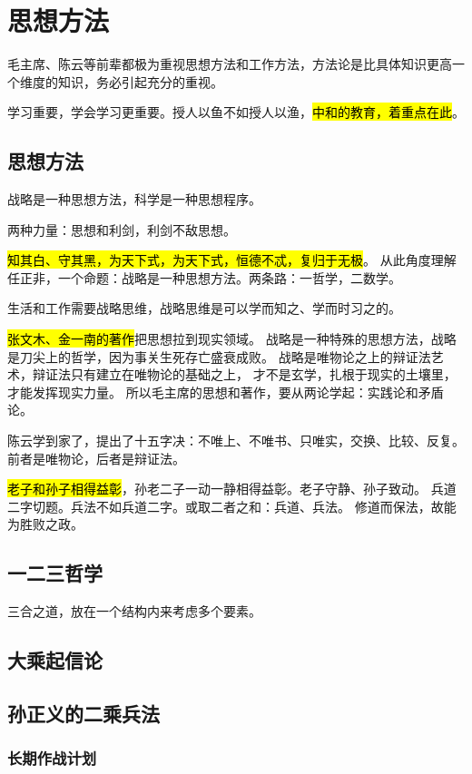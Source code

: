 \chapter{思想方法}

毛主席、陈云等前辈都极为重视思想方法和工作方法，方法论是比具体知识更高一个维度的知识，务必引起充分的重视。

学习重要，学会学习更重要。授人以鱼不如授人以渔，\hl{中和的教育，着重点在此}。

\section{思想方法}

战略是一种思想方法，科学是一种思想程序。

两种力量：思想和利剑，利剑不敌思想。

\hl{知其白、守其黑，为天下式，为天下式，恒德不忒，复归于无极}。
从此角度理解任正非，一个命题：战略是一种思想方法。两条路：一哲学，二数学。

生活和工作需要战略思维，战略思维是可以学而知之、学而时习之的。

\hl{张文木、金一南的著作}把思想拉到现实领域。
战略是一种特殊的思想方法，战略是刀尖上的哲学，因为事关生死存亡盛衰成败。
战略是唯物论之上的辩证法艺术，辩证法只有建立在唯物论的基础之上，
才不是玄学，扎根于现实的土壤里，才能发挥现实力量。
所以毛主席的思想和著作，要从两论学起：实践论和矛盾论。

陈云学到家了，提出了十五字决：不唯上、不唯书、只唯实，交换、比较、反复。
前者是唯物论，后者是辩证法。

\hl{老子和孙子相得益彰}，孙老二子一动一静相得益彰。老子守静、孙子致动。
兵道二字切题。兵法不如兵道二字。或取二者之和：兵道、兵法。
修道而保法，故能为胜败之政。

\section{一二三哲学}

三合之道，放在一个结构内来考虑多个要素。

\section{大乘起信论}

\section{孙正义的二乘兵法}

\subsection{长期作战计划}

